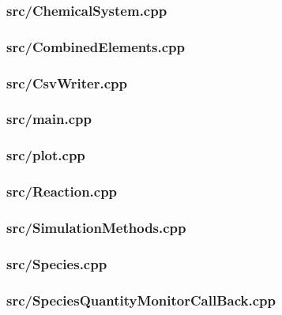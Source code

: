\subsubsection{src/ChemicalSystem.cpp}

\newpage
\subsubsection{src/CombinedElements.cpp}

\newpage
\subsubsection{src/CsvWriter.cpp}

\newpage
\subsubsection{src/main.cpp}

\newpage
\subsubsection{src/plot.cpp}

\newpage
\subsubsection{src/Reaction.cpp}

\newpage
\subsubsection{src/SimulationMethods.cpp}

\newpage
\subsubsection{src/Species.cpp}

\newpage
\subsubsection{src/SpeciesQuantityMonitorCallBack.cpp}

\newpage

